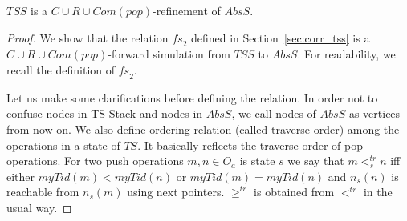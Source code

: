 \begin{lem}
$TSS$ is a $C\cup R\cup Com(pop)$-refinement of $AbsS$. 
\end{lem}
\begin{proof}
We show that the relation $\mathit{fs}_2$ defined in Section~\ref{sec:corr_tss} is a $C\cup R\cup Com(pop)$-forward simulation  from $TSS$ to $AbsS$. For readability, we recall the definition of $\mathit{fs}_2$.

Let us make some clarifications before defining the relation. In order not to confuse nodes in TS Stack and nodes in $AbsS$, we call nodes of $AbsS$ as vertices from now on. We also define ordering relation (called traverse order) among the operations in a state of $TS$. It basically reflects the traverse order of pop operations. For two push operations $m,n \in O_a$ is state $s$ we say that $m <^{tr}_s n$ iff either $myTid(m) < myTid(n)$ or $myTid(m) = myTid(n)$ and $n_s(n)$ is reachable from $n_s(m)$ using next pointers. $\geq^{tr}$ is obtained from $<^{tr}$ in the usual way.


\end{proof}

